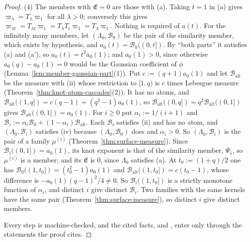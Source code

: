 \begin{proof}
(4) The members with $\mathfrak{E} = 0$ are those with (a). Taking $t = 1$ in (a) gives
$\varpi_\lambda = T_\lambda\varpi_1$ for all $\lambda > 0$; conversely this gives
$\varpi_{\lambda t} = T_{\lambda t}\varpi_1 = T_\lambda T_t\varpi_1 = T_\lambda\varpi_t$. Nothing is
required of $a(t)$. For the infinitely many members, let $(\Lambda_0, \mathcal{B}_0)$ be the pair of the
similarity member, which exists by hypothesis, and $a_0(t) = \mathcal{B}_0((0,t])$. By ``both
parts'' it satisfies (a) and (a$'$), so $a_0(t) = t^2a_0(1)$; and $a_0(1) > 0$, since otherwise
$a_0(q) - a_0(1) = 0$ would be the Gaussian coefficient of $\phi$
(Lemma~\ref{lem:member-gaussian-part}(1)). Put
$c := (q + 1)a_0(1)$ and let $\mathcal{B}_{\mathrm{alt}}$ be the measure with (ii) whose restriction to
$[1,q)$ is $c$ times Lebesgue measure (Theorem~\ref{thm:knot-atom-cascades}(2)). It has no atoms, and
$\mathcal{B}_{\mathrm{alt}}((1,q]) = c(q - 1) = (q^2 - 1)a_0(1)$, so
$\mathcal{B}_{\mathrm{alt}}((0,q]) = q^2\mathcal{B}_{\mathrm{alt}}((0,1])$ gives
$\mathcal{B}_{\mathrm{alt}}((0,1]) = a_0(1)$. For $i \ge 0$ put $\alpha_i := 1/(i + 1)$ and
$\mathcal{B}_i := \alpha_i\mathcal{B}_0 + (1 - \alpha_i)\mathcal{B}_{\mathrm{alt}}$. Each $\mathcal{B}_i$
satisfies (ii) and has no atom, and $(\Lambda_0, \mathcal{B}_i)$ satisfies (iv) because
$(\Lambda_0, \mathcal{B}_0)$ does and $\alpha_i > 0$. So $(\Lambda_0, \mathcal{B}_i)$ is the pair of a
family $\mu^{(i)}$ (Theorem~\ref{thm:surface-measure}). Since $\mathcal{B}_i((0,1]) = a_0(1)$, its
knot exponent is that of the similarity member, $\Psi_1$, so $\mu^{(i)}$ is a member; and its
$\mathfrak{E}$ is $0$, since $\Lambda_0$ satisfies (a). At $t_0 := (1 + q)/2$ one has
$\mathcal{B}_0((1,t_0]) = (t_0^2 - 1)a_0(1)$ and $\mathcal{B}_{\mathrm{alt}}((1,t_0]) = c(t_0 - 1)$,
whose difference is $-a_0(1)(q - 1)^2/4 \ne 0$. So $\mathcal{B}_i((1,t_0])$ is a strictly monotone
function of $\alpha_i$, and distinct $i$ give distinct $\mathcal{B}_i$. Two families with the same kernels
have the same pair (Theorem~\ref{thm:surface-measure}), so distinct $i$ give distinct members.

Every step is machine-checked, and the cited facts,  and , enter only
through the statements the proof cites.
\end{proof}

